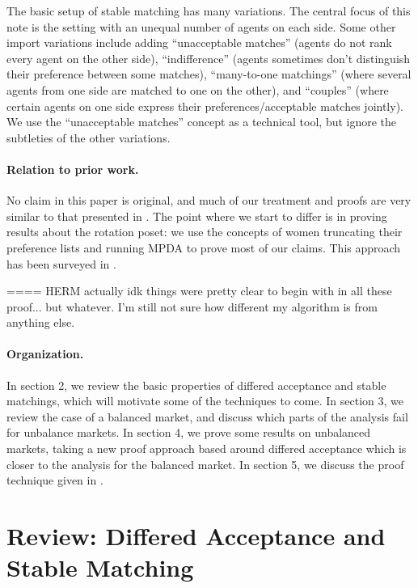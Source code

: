 \documentclass[12pt]{article}
\begin{document}
  The basic setup of stable matching has many variations.
  The central focus of this note is the setting with an unequal number of agents
  on each side.
  Some other import variations include adding ``unacceptable matches'' (agents do not
  rank every agent on the other side), ``indifference'' (agents sometimes don't
  distinguish their preference between some matches), ``many-to-one matchings''
  (where several agents from one side are matched to one on the other),
  and ``couples'' (where certain agents on one side express their 
  preferences/acceptable matches jointly).
  We use the ``unacceptable matches'' concept as a technical tool,
  but ignore the subtleties of the other variations.

  \paragraph{Relation to prior work.}
  No claim in this paper is original, and much of our treatment and proofs are
  very similar to that presented in \cite{GusfieldStableStructureAlgs89}.
  The point where we start to differ is in proving results about the rotation
  poset: we use the concepts of women truncating their preference lists and
  running MPDA to prove most of our claims.
  This approach has been surveyed in \cite{ManloveMatchPrefs13}.

  ==== HERM actually idk things were pretty clear to begin with in all these
  proof... but whatever. I'm still not sure how different my algorithm is from
  anything else.

  \paragraph{Organization.}
  In section 2, we review the basic properties of differed acceptance and stable
  matchings, which will motivate some of the techniques to come.
  In section 3, we review the case of a balanced market, and discuss which parts
  of the analysis fail for unbalance markets.
  In section 4, we prove some results on unbalanced markets, taking a new proof
  approach based around differed acceptance which is closer to the analysis for
  the balanced market.
  In section 5, we discuss the proof technique given in
  \cite{AshlagiUnbalancedCompetition17}.

\section{Review: Differed Acceptance and Stable Matching}
\end{document}
